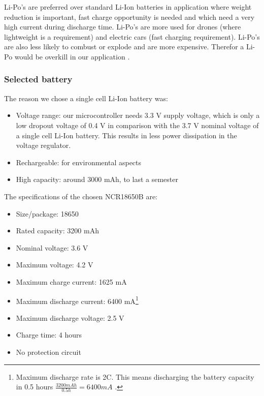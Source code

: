 \documentclass[11pt,a4paper]{article}
\begin{document}
Li-Po's are preferred over standard Li-Ion batteries in application where weight reduction is important, fast charge opportunity is needed and which need a very high current during discharge time. Li-Po's are more used for drones (where lightweight is a requirement) and electric cars (fast charging requirement). Li-Po's are also less likely to combust or explode and are more expensive. Therefor a Li-Po would be overkill in our application \cite{LiIonVsLiPo_Ovonic,LiIon_Wiki,LiPo_Wiki}. 

\subsubsection{Selected battery}\label{sec:selected_battery}
The reason we chose a single cell Li-Ion battery was:
\begin{itemize}
	\item Voltage range: our microcontroller needs 3.3 V supply voltage, which is only a low dropout voltage of 0.4 V in comparison with the 3.7 V nominal voltage of a single cell Li-Ion battery. This results in less power dissipation in the voltage regulator. 
	\item Rechargeable: for environmental aspects
	\item High capacity: around 3000 mAh, to last a semester
\end{itemize}
The specifications of the chosen NCR18650B are:
\begin{itemize}
	\item Size/package: 18650
	\item Rated capacity: 3200 mAh
	\item Nominal voltage: 3.6 V
	\item Maximum voltage: 4.2 V
	\item Maximum charge current: 1625 mA
	\item Maximum discharge current: 6400 mA\footnote{Maximum discharge rate is 2C. This means discharging the battery capacity in 0.5 hours $\frac{3200 mAh}{0.5 h} = 6400 mA$ .} %
	\item Maximum discharge voltage: 2.5 V
	\item Charge time: 4 hours
	\item No protection circuit
\end{itemize}
\end{document}
